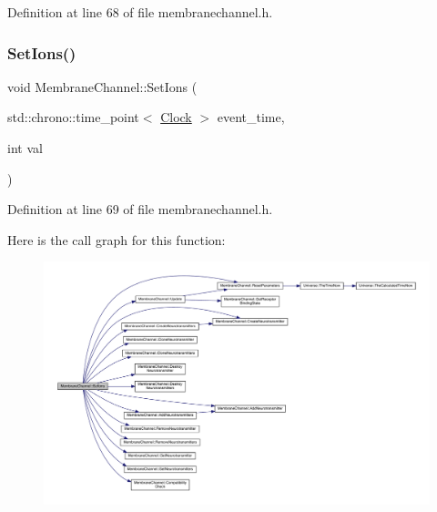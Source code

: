 Definition at line 68 of file membranechannel.\+h.

\mbox{\label{class_membrane_channel_a1fe0c61eccbb6aa0d905ead27e8337bd}} 
\subsubsection{\texorpdfstring{Set\+Ions()}{SetIons()}}
{\footnotesize\ttfamily void Membrane\+Channel\+::\+Set\+Ions (\begin{DoxyParamCaption}\item[{std\+::chrono\+::time\+\_\+point$<$ \hyperlink{universe_8h_a0ef8d951d1ca5ab3cfaf7ab4c7a6fd80}{Clock} $>$}]{event\+\_\+time,  }\item[{int}]{val }\end{DoxyParamCaption})\hspace{0.3cm}{\ttfamily [inline]}}



Definition at line 69 of file membranechannel.\+h.

Here is the call graph for this function\+:
\nopagebreak
\begin{figure}[H]
\begin{center}
\leavevmode
\includegraphics[width=350pt]{class_membrane_channel_a1fe0c61eccbb6aa0d905ead27e8337bd_cgraph}
\end{center}
\end{figure}
\mbox{\label{class_membrane_channel_a9f5c69ab1f4dce6113fceebaaa4f15f4}} 
